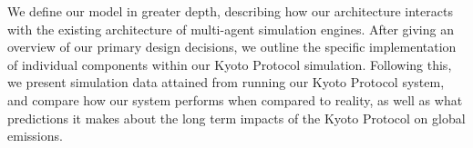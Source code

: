 We define our model in greater depth, describing how our architecture interacts with the existing architecture of multi-agent simulation engines. After giving an overview of our primary design decisions, we outline the specific implementation of individual components within our Kyoto Protocol simulation. Following this, we present simulation data attained from running our Kyoto Protocol system, and compare how our system performs when compared to reality, as well as what predictions it makes about the long term impacts of the Kyoto Protocol on global emissions.

